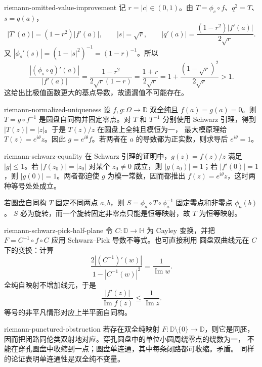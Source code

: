 \begin{solution}{riemann-omitted-value-improvement}
记 $r=|c|\in(0,1)$。由 $T=\phi_c\circ f$、$q^2=T$、$s=q(a)$，
\[
 |T'(a)|=(1-r^2)|f'(a)|,\qquad |s|=\sqrt r,\qquad
 |q'(a)|=\frac{(1-r^2)|f'(a)|}{2\sqrt r}.
\]
又 $|\phi_s'(s)|=(1-|s|^2)^{-1}=(1-r)^{-1}$。所以
\[
 \frac{|(\phi_s\circ q)'(a)|}{|f'(a)|}
 =\frac{1-r^2}{2\sqrt r(1-r)}
 =\frac{1+r}{2\sqrt r}
 =1+\frac{(1-\sqrt r)^2}{2\sqrt r}>1.
\]
这给出比极值函数更大的基点导数，故遗漏值不可能存在。
\end{solution}

\begin{solution}{riemann-normalized-uniqueness}
设 $f,g:\Omega\to\mathbb D$ 双全纯且 $f(a)=g(a)=0$。则
$T=g\circ f^{-1}$ 是圆盘自同构并固定零点。对 $T$ 和 $T^{-1}$ 分别使用
Schwarz 引理，得到 $|T(z)|=|z|$。于是 $T(z)/z$ 在圆盘上全纯且模恒为一，
最大模原理给 $T(z)=e^{i\theta}z$。因此 $g=e^{i\theta}f$。若两者在 $a$
的导数都为正实数，则求导后 $e^{i\theta}=1$。
\end{solution}

\begin{solution}{riemann-schwarz-equality}
在 Schwarz 引理的证明中，$g(z)=f(z)/z$ 满足 $|g|\le1$。若
$|f(z_0)|=|z_0|$ 对某个 $z_0\ne0$ 成立，则 $|g(z_0)|=1$；若
$|f'(0)|=1$，则 $|g(0)|=1$。两者都迫使 $g$ 为模一常数，因而都推出
$f(z)=e^{i\theta}z$，这时两种等号处处成立。

若圆盘自同构 $T$ 固定不同两点 $a,b$，则
$S=\phi_a\circ T\circ\phi_a^{-1}$ 固定零点和非零点 $\phi_a(b)$。
$S$ 必为旋转，而一个旋转固定非零点只能是恒等映射，故 $T$ 为恒等映射。
\end{solution}

\begin{solution}{riemann-schwarz-pick-half-plane}
令 $C:\mathbb D\to\mathbb H$ 为 Cayley 变换，并把
$F=C^{-1}\circ f\circ C$ 应用 Schwarz--Pick 导数不等式。也可直接利用
圆盘双曲线元在 $C$ 下的变换：计算
\[
 \frac{2|(C^{-1})'(w)|}{1-|C^{-1}(w)|^2}
 =\frac1{\operatorname{Im}w}.
\]
全纯自映射不增加线元，于是
\[
 \frac{|f'(z)|}{\operatorname{Im}f(z)}
 \le\frac1{\operatorname{Im}z}.
\]
等号的非平凡情形对应上半平面自同构。
\end{solution}

\begin{solution}{riemann-punctured-obstruction}
若存在双全纯映射 $F:\mathbb D\setminus\{0\}\to\mathbb D$，则它是同胚，
因而把闭路同伦类双射地对应。穿孔圆盘中的单位小圆周绕零点的绕数为一，
不能在穿孔圆盘中收缩到一点；圆盘单连通，其中每条闭路都可收缩。矛盾。
同样的论证表明单连通性是双全纯不变量。
\end{solution}

